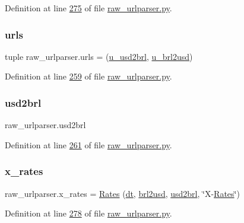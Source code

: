 Definition at line \hyperlink{raw__urlparser_8py_source_l00275}{275} of file \hyperlink{raw__urlparser_8py_source}{raw\+\_\+urlparser.\+py}.

\mbox{\label{namespaceraw__urlparser_aded92a1146e1ce1f14fd79a361f947f9}} 
\subsubsection{\texorpdfstring{urls}{urls}}
{\footnotesize\ttfamily tuple raw\+\_\+urlparser.\+urls = (\hyperlink{namespaceraw__urlparser_a63e1f0abe7b1f43c4891ce9aec98261d}{u\+\_\+usd2brl}, \hyperlink{namespaceraw__urlparser_a876711ddd7ebb3991a35cc1768d1d22c}{u\+\_\+brl2usd})}



Definition at line \hyperlink{raw__urlparser_8py_source_l00259}{259} of file \hyperlink{raw__urlparser_8py_source}{raw\+\_\+urlparser.\+py}.

\mbox{\label{namespaceraw__urlparser_adb724d2d0b7c561e8b0c53a42831efce}} 
\subsubsection{\texorpdfstring{usd2brl}{usd2brl}}
{\footnotesize\ttfamily raw\+\_\+urlparser.\+usd2brl}



Definition at line \hyperlink{raw__urlparser_8py_source_l00261}{261} of file \hyperlink{raw__urlparser_8py_source}{raw\+\_\+urlparser.\+py}.

\mbox{\label{namespaceraw__urlparser_a76bac0500149c0b7dc5e8dfef56f05c3}} 
\subsubsection{\texorpdfstring{x\+\_\+rates}{x\_rates}}
{\footnotesize\ttfamily raw\+\_\+urlparser.\+x\+\_\+rates = \hyperlink{classraw__urlparser_1_1_rates}{Rates} (\hyperlink{namespaceraw__urlparser_acbaf2eef75f4aa43e1f6659c0fd34836}{dt}, \hyperlink{namespaceraw__urlparser_ae7e1c02df9ab0102e017e31885aa6431}{brl2usd}, \hyperlink{namespaceraw__urlparser_adb724d2d0b7c561e8b0c53a42831efce}{usd2brl}, \char`\"{}X-\/\hyperlink{classraw__urlparser_1_1_rates}{Rates}\char`\"{})}



Definition at line \hyperlink{raw__urlparser_8py_source_l00278}{278} of file \hyperlink{raw__urlparser_8py_source}{raw\+\_\+urlparser.\+py}.

